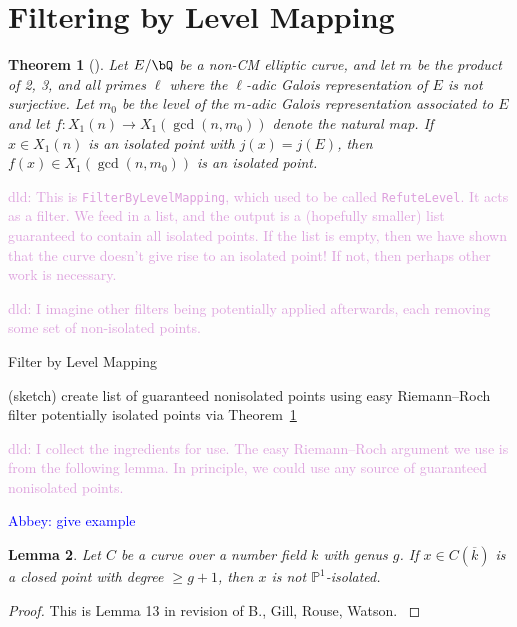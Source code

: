 \documentclass[11pt,reqno]{amsart}
\theoremstyle{plain}
\newtheorem{theorem}{Theorem}%
\newtheorem{lemma}[theorem]{Lemma}
\theoremstyle{definition}
\newcommand{\Q}{\bQ}
\newcommand{\abbey}[1]{\textcolor{blue}{Abbey: #1}}
\newcommand{\dld}[1]{\textcolor{Plum}{dld: #1}}
\begin{document}
\section{Filtering by Level Mapping}

\begin{theorem}[\cite{BELOV}]\label{BELOVthm}
Let $E/\Q$ be a non-CM elliptic curve, and let $m$ be the product of 2, 3, and all primes $\ell$ where the $\ell$-adic Galois representation of $E$ is not surjective. Let $m_0$ be the level of the $m$-adic Galois representation associated to $E$ and let $f: X_1(n) \rightarrow X_1(\gcd(n,m_0))$ denote the natural map. If $x\in X_1(n)$ is an isolated point with $j(x)=j(E)$, then $f(x)\in X_1(\gcd(n,m_0))$ is an isolated point.
\end{theorem}

\dld{This is \texttt{FilterByLevelMapping}, which used to be called
\texttt{RefuteLevel}. It acts as a filter. We feed in a list, and the output is
a (hopefully smaller) list guaranteed to contain all isolated points. If the
list is empty, then we have shown that the curve doesn't give rise to an
isolated point! If not, then perhaps other work is necessary.}

\dld{I imagine other filters being potentially applied afterwards, each
removing some set of non-isolated points.}

\begin{algorithm}[H]\caption{Filter by Level Mapping}\label{alg:level_mapping}
  (sketch)\;
  create list of guaranteed nonisolated points using easy Riemann--Roch\;
  filter potentially isolated points via Theorem~\ref{BELOVthm}\;
\end{algorithm}

\dld{I collect the ingredients for use. The easy Riemann--Roch argument we use
is from the following lemma. In principle, we could use any source of
guaranteed nonisolated points.}

\abbey{give example}

\begin{lemma}
Let $C$ be a curve over a number field $k$ with genus $g$. If $x \in C(\overline{k})$ is a closed point with degree
$\geq g+1$, then $x$ is not $\mathbb{P}^{1}$-isolated.
\end{lemma}

\begin{proof}
This is Lemma 13 in revision of B., Gill, Rouse, Watson. \cite{OddDeg}
\end{proof}
\end{document}

